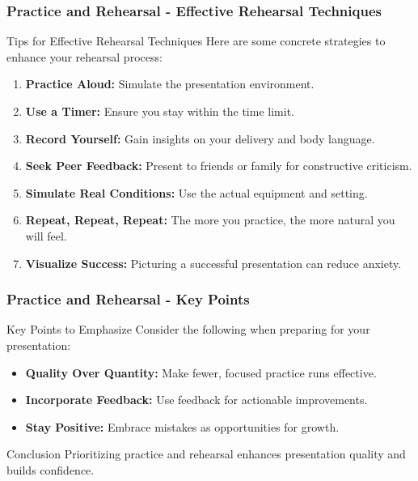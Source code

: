 \documentclass[aspectratio=169]{beamer}
\begin{document}
\begin{frame}[fragile]
    \frametitle{Practice and Rehearsal - Effective Rehearsal Techniques}

    \begin{block}{Tips for Effective Rehearsal Techniques}
        Here are some concrete strategies to enhance your rehearsal process:
    \end{block}

    \begin{enumerate}
        \item \textbf{Practice Aloud:} Simulate the presentation environment.
        \item \textbf{Use a Timer:} Ensure you stay within the time limit.
        \item \textbf{Record Yourself:} Gain insights on your delivery and body language.
        \item \textbf{Seek Peer Feedback:} Present to friends or family for constructive criticism.
        \item \textbf{Simulate Real Conditions:} Use the actual equipment and setting.
        \item \textbf{Repeat, Repeat, Repeat:} The more you practice, the more natural you will feel.
        \item \textbf{Visualize Success:} Picturing a successful presentation can reduce anxiety.
    \end{enumerate}
\end{frame}

\begin{frame}[fragile]
    \frametitle{Practice and Rehearsal - Key Points}

    \begin{block}{Key Points to Emphasize}
        Consider the following when preparing for your presentation:
    \end{block}

    \begin{itemize}
        \item \textbf{Quality Over Quantity:} Make fewer, focused practice runs effective.
        \item \textbf{Incorporate Feedback:} Use feedback for actionable improvements.
        \item \textbf{Stay Positive:} Embrace mistakes as opportunities for growth.
    \end{itemize}

    \begin{block}{Conclusion}
        Prioritizing practice and rehearsal enhances presentation quality and builds confidence.
    \end{block}
\end{frame}
\end{document}
